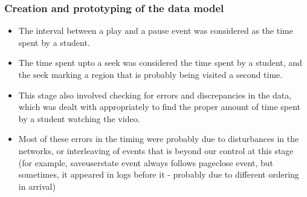 \documentclass[12pt,xcolor=dvipsnames]{beamer}
\begin{document}
\begin{frame}[t]
\frametitle{Creation and prototyping of the data model}

\begin{itemize}

\item The interval between a play and a pause event was considered as the time spent by a student.

\item The time spent upto a seek was considered the time spent by a student, and the seek marking a region that is probably being visited a second time.

\item This stage also involved checking for errors and discrepancies in the data, which was dealt with appropriately to find the proper amount of time spent by a student watching the video.

\item Most of these errors in the timing were probably due to disturbances in the networks, or interleaving of events that is beyond our control at this stage (for example, saveuserstate event always follows pageclose event, but sometimes, it appeared in logs before it - probably due to different ordering in arrival)


\end{itemize}

\end{frame}
\end{document}
